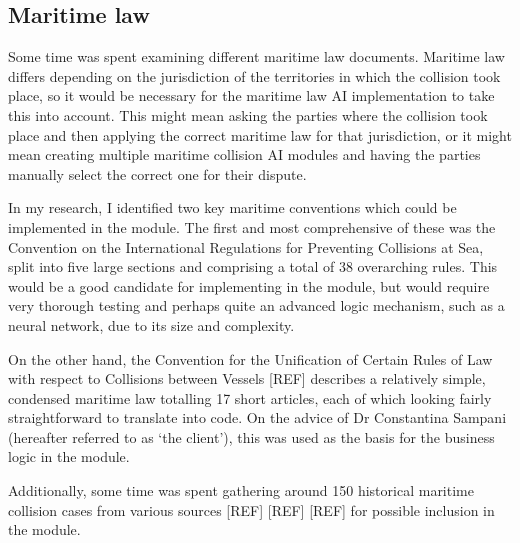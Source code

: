 \subsection{Maritime law}

Some time was spent examining different maritime law documents. Maritime law differs depending on the jurisdiction of the territories in which the collision took place, so it would be necessary for the maritime law AI implementation to take this into account. This might mean asking the parties where the collision took place and then applying the correct maritime law for that jurisdiction, or it might mean creating multiple maritime collision AI modules and having the parties manually select the correct one for their dispute.

In my research, I identified two key maritime conventions which could be implemented in the module. The first and most comprehensive of these was the Convention on the International Regulations for Preventing Collisions at Sea, split into five large sections and comprising a total of 38 overarching rules. This would be a good candidate for implementing in the module, but would require very thorough testing and perhaps quite an advanced logic mechanism, such as a neural network, due to its size and complexity. %

On the other hand, the Convention for the Unification of Certain Rules of Law with respect to Collisions between Vessels [REF] describes a relatively simple, condensed maritime law totalling 17 short articles, each of which looking fairly straightforward to translate into code. On the advice of Dr Constantina Sampani (hereafter referred to as `the client'), this was used as the basis for the business logic in the module. %

Additionally, some time was spent gathering around 150 historical maritime collision cases from various sources [REF] [REF] [REF] for possible inclusion in the module. %

